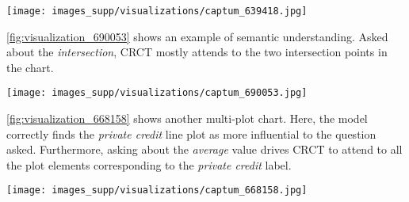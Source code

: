 \documentclass[runningheads]{llncs}
\newcommand\our[1][]{CRCT\xspace}
\begin{document}
\begin{figure*}[htpb]
\begin{center}
\texttt{[image: images\_supp/visualizations/captum\_639418.jpg]}
\end{center}
   \caption{Explainability visualizations for a PlotQA test sample. Q: {\it Is the amount of revenue collected in 2005 less than that in 2008?} ground truth: Yes. \our: \textcolor{ForestGreen}{Yes}. Note the high attention on the correct plot between the two. The font sizes are from the dataset source.}
\label{fig:visualization_639418_}
\end{figure*}

\cref{fig:visualization_690053} shows an example of semantic understanding. Asked about the {\it intersection}, CRCT mostly attends to the two intersection points in the chart.
\begin{figure*}[htpb]
\begin{center}
\texttt{[image: images\_supp/visualizations/captum\_690053.jpg]}
\end{center}
   \caption{Explainability visualizations for a PlotQA test sample. Q: {\it How many lines intersect with each other?}, Ground truth: 3. \our: \textcolor{ForestGreen}{3}. Note the hot spots at the intersection points.}
\label{fig:visualization_690053}
\end{figure*}

\cref{fig:visualization_668158} shows another multi-plot chart. Here, the model correctly finds the {\it private credit} line plot as more influential to the question asked. Furthermore, asking about the {\it average} value drives CRCT to attend to all the plot elements corresponding to the {\it private credit} label.
\begin{figure*}[htpb]
\begin{center}
\texttt{[image: images\_supp/visualizations/captum\_668158.jpg]}
\end{center}
   \caption{Explainability visualizations for a PlotQA test sample. Q: {\it What is the average percentage of firms listed by \textbf{private} credit bureau per year?} Ground truth: 3.379. \our: \textcolor{ForestGreen}{3.295} (Error: \textcolor{Red}{-2.49\%}). Note how the model attends the correct plot among the two, with ''hot" bounding boxes over all the plot due to {\it average} request.}
\label{fig:visualization_668158}
\end{figure*}
\end{document}
